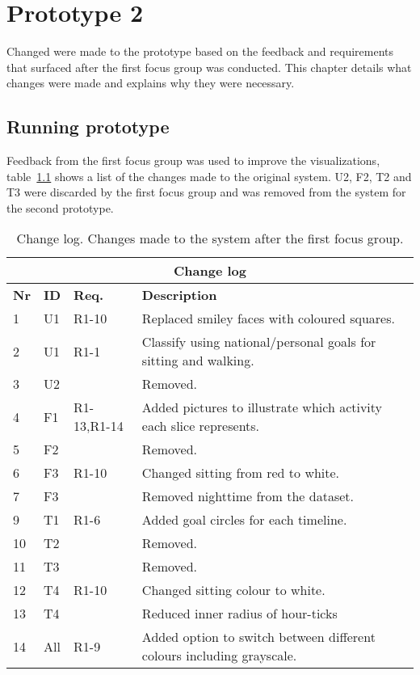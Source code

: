 \chapter{Prototype 2}
Changed were made to the prototype based on the feedback and requirements that surfaced after the first focus group was conducted. This chapter details what changes were made and explains why they were necessary.
\section{Running prototype}
\label{sec:runningPrototype2}
Feedback from the first focus group was used to improve the visualizations, table~\ref{fig:changeLog} shows a list of the changes made to the original system. U2, F2, T2 and T3 were discarded by the first focus group and was removed from the system for the second prototype. 

\begin{table}[h!]
  \centering
  \begin{tabular}{|l|l|l|p{8cm}|}
      \multicolumn{4}{c}{\textbf{Change log}} \\ \hline
      \textbf{Nr} & \textbf{ID} & \textbf{Req.} & \textbf{Description} \\ \hline
      1  & U1  & R1-10       & Replaced smiley faces with coloured squares. \\ \hline
      2  & U1  & R1-1        & Classify using national/personal goals for sitting and walking.\\ \hline 
      3  & U2  &             & Removed. \\ \hline
      4  & F1  & R1-13,R1-14 & Added pictures to illustrate which activity each slice represents. \\ \hline
      5  & F2  &             & Removed. \\ \hline 
      6  & F3  & R1-10       & Changed sitting from red to white. \\ \hline
      7  & F3  &             & Removed nighttime from the dataset. \\ \hline
      9  & T1  & R1-6        & Added goal circles for each timeline. \\ \hline
      10 & T2  &             & Removed. \\ \hline
      11 & T3  &             & Removed. \\ \hline
      12 & T4  & R1-10       & Changed sitting colour to white. \\ \hline
      13 & T4  &             & Reduced inner radius of hour-ticks \\ \hline
      14 & All & R1-9        & Added option to switch between different colours including grayscale. \\ \hline
  \end{tabular}
  \caption{Change log. Changes made to the system after the first focus group.}
  \label{fig:changeLog}
\end{table}

